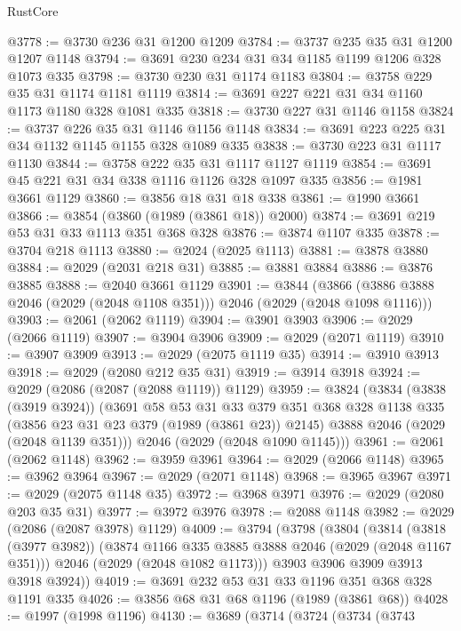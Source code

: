 \begin{lexlean}{RustCore}
\begin{coremodule}
@3778 := @3730 @236 @31 @1200 @1209
@3784 := @3737 @235 @35 @31 @1200 @1207 @1148
@3794 := @3691 @230 @234 @31 @34 @1185 @1199 @1206 @328 @1073 @335
@3798 := @3730 @230 @31 @1174 @1183
@3804 := @3758 @229 @35 @31 @1174 @1181 @1119
@3814 := @3691 @227 @221 @31 @34 @1160 @1173 @1180 @328 @1081 @335
@3818 := @3730 @227 @31 @1146 @1158
@3824 := @3737 @226 @35 @31 @1146 @1156 @1148
@3834 := @3691 @223 @225 @31 @34 @1132 @1145 @1155 @328 @1089 @335
@3838 := @3730 @223 @31 @1117 @1130
@3844 := @3758 @222 @35 @31 @1117 @1127 @1119
@3854 := @3691 @45 @221 @31 @34 @338 @1116 @1126 @328 @1097 @335
@3856 := @1981 @3661 @1129
@3860 := @3856 @18 @31 @18 @338
@3861 := @1990 @3661
@3866 := @3854 (@3860 (@1989 (@3861 @18)) @2000)
@3874 := @3691 @219 @53 @31 @33 @1113 @351 @368 @328
@3876 := @3874 @1107 @335
@3878 := @3704 @218 @1113
@3880 := @2024 (@2025 @1113)
@3881 := @3878 @3880
@3884 := @2029 (@2031 @218 @31)
@3885 := @3881 @3884
@3886 := @3876 @3885
@3888 := @2040 @3661 @1129
@3901 := @3844
    (@3866 (@3886 @3888 @2046 (@2029 (@2048 @1108 @351))) @2046 (@2029 (@2048 @1098 @1116)))
@3903 := @2061 (@2062 @1119)
@3904 := @3901 @3903
@3906 := @2029 (@2066 @1119)
@3907 := @3904 @3906
@3909 := @2029 (@2071 @1119)
@3910 := @3907 @3909
@3913 := @2029 (@2075 @1119 @35)
@3914 := @3910 @3913
@3918 := @2029 (@2080 @212 @35 @31)
@3919 := @3914 @3918
@3924 := @2029 (@2086 (@2087 (@2088 @1119)) @1129)
@3959 := @3824
    (@3834
      (@3838 (@3919 @3924))
      (@3691
        @58
        @53
        @31
        @33
        @379
        @351
        @368
        @328
        @1138
        @335
        (@3856 @23 @31 @23 @379 (@1989 (@3861 @23)) @2145)
        @3888
        @2046
        (@2029 (@2048 @1139 @351)))
      @2046
      (@2029 (@2048 @1090 @1145)))
@3961 := @2061 (@2062 @1148)
@3962 := @3959 @3961
@3964 := @2029 (@2066 @1148)
@3965 := @3962 @3964
@3967 := @2029 (@2071 @1148)
@3968 := @3965 @3967
@3971 := @2029 (@2075 @1148 @35)
@3972 := @3968 @3971
@3976 := @2029 (@2080 @203 @35 @31)
@3977 := @3972 @3976
@3978 := @2088 @1148
@3982 := @2029 (@2086 (@2087 @3978) @1129)
@4009 := @3794
    (@3798
      (@3804
        (@3814
          (@3818 (@3977 @3982))
          (@3874 @1166 @335 @3885 @3888 @2046 (@2029 (@2048 @1167 @351)))
          @2046
          (@2029 (@2048 @1082 @1173)))
        @3903
        @3906
        @3909
        @3913
        @3918
        @3924))
@4019 := @3691 @232 @53 @31 @33 @1196 @351 @368 @328 @1191 @335
@4026 := @3856 @68 @31 @68 @1196 (@1989 (@3861 @68))
@4028 := @1997 (@1998 @1196)
@4130 := @3689
    (@3714
      (@3724
        (@3734
          (@3743

\end{coremodule}
\end{lexlean}

